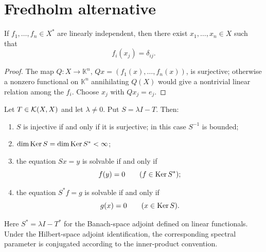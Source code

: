 \section{Fredholm alternative}

\begin{notelemma}
If $f_1,\ldots,f_n\in X^*$ are linearly independent, then there exist
$x_1,\ldots,x_n\in X$ such that
\[
  f_i(x_j)=\delta_{ij}.
\]
\end{notelemma}

\begin{proof}
The map $Q\colon X\to\mathbb K^n$, $Qx=(f_1(x),\ldots,f_n(x))$, is
surjective; otherwise a nonzero functional on $\mathbb K^n$ annihilating
$Q(X)$ would give a nontrivial linear relation among the $f_i$.  Choose
$x_j$ with $Qx_j=e_j$.
\end{proof}

\begin{notetheorem}
Let $T\in\mathcal{K}(X,X)$ and let $\lambda\ne0$.  Put
$S=\lambda I-T$.  Then:
\begin{enumerate}
  \item $S$ is injective if and only if it is surjective; in this case
        $S^{-1}$ is bounded;
  \item $\dim\operatorname{Ker} S=\dim\operatorname{Ker} S^*<\infty$;
  \item the equation $Sx=y$ is solvable if and only if
        \[
          f(y)=0\qquad(f\in\operatorname{Ker} S^*);
        \]
  \item the equation $S^*f=g$ is solvable if and only if
        \[
          g(x)=0\qquad(x\in\operatorname{Ker} S).
        \]
\end{enumerate}
Here $S^*=\lambda I-T^*$ for the Banach-space adjoint defined on linear
functionals.  Under the Hilbert-space adjoint identification, the corresponding
spectral parameter is conjugated according to the inner-product convention.
\end{notetheorem}

